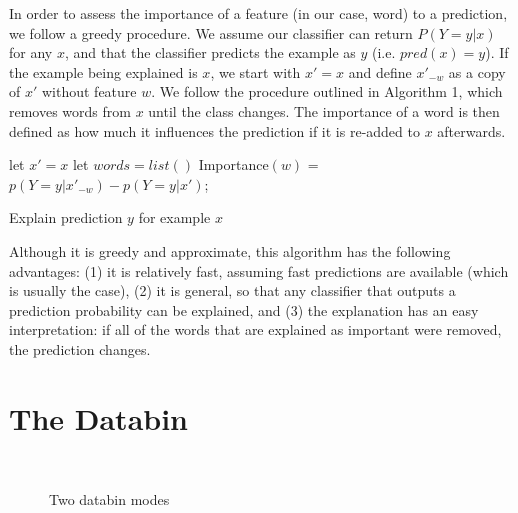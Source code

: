 \documentclass{chi2009}
\begin{document}
In order to assess the importance of a feature (in our case, word) to a
prediction, we follow a greedy procedure. We assume our classifier can return
$P(Y=y|x)$ for any $x$, and that the classifier predicts the example as $y$
(i.e. $pred(x) = y$). If
the example being explained is $x$, we start with $x' = x$ and define $x'_{-w}$
as a copy of $x'$ without feature $w$. We follow the procedure outlined in
Algorithm 1, which removes words from $x$ until the class changes. The
importance of a word is then defined as how much it influences the prediction if
it is re-added to $x$ afterwards.

\begin{algorithm}
 let $x' = x$\;
 let $words = list()$\;
  {
  Importance$(w)$ = $p(Y=y | x'_{-w}) - p(Y=y | x')$;
 }
 \caption{Explain prediction $y$ for example $x$}
\end{algorithm}

Although it is greedy and approximate, this algorithm has the following
advantages: (1) it is relatively fast, assuming fast predictions are available
(which is usually the case), (2) it is general, so that any classifier that
outputs a prediction probability can be explained, and (3) the explanation has
an easy interpretation: if all of the words that are explained as important
were removed, the prediction changes.

\section{The Databin}
\begin{figure}
  \\
  \caption{Two databin modes}
  \label{fig:databin}
\end{figure}
\end{document}
